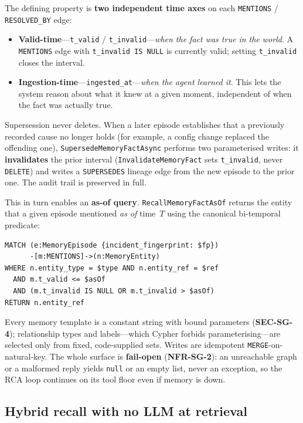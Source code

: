 \documentclass[11pt]{article}
\begin{document}
The defining property is \textbf{two independent time axes} on each
\texttt{MENTIONS} / \texttt{RESOLVED\_BY} edge:

\begin{itemize}
  \item \textbf{Valid-time}---\texttt{t\_valid} / \texttt{t\_invalid}---\emph{when
    the fact was true in the world}. A \texttt{MENTIONS} edge with
    \texttt{t\_invalid IS NULL} is currently valid; setting \texttt{t\_invalid}
    closes the interval.
  \item \textbf{Ingestion-time}---\texttt{ingested\_at}---\emph{when the agent
    learned it}. This lets the system reason about what it knew at a given moment,
    independent of when the fact was actually true.
\end{itemize}

Supersession never deletes. When a later episode establishes that a previously
recorded cause no longer holds (for example, a config change replaced the
offending one), \texttt{SupersedeMemoryFactAsync} performs two parameterised
writes: it \textbf{invalidates} the prior interval (\texttt{InvalidateMemoryFact}
sets \texttt{t\_invalid}, never \texttt{DELETE}) and writes a \texttt{SUPERSEDES}
lineage edge from the new episode to the prior one. The audit trail is preserved
in full.

This in turn enables an \textbf{as-of query}. \texttt{RecallMemoryFactAsOf}
returns the entity that a given episode mentioned \emph{as of} time~$T$ using the
canonical bi-temporal predicate:

\begin{verbatim}
MATCH (e:MemoryEpisode {incident_fingerprint: $fp})
      -[m:MENTIONS]->(n:MemoryEntity)
WHERE n.entity_type = $type AND n.entity_ref = $ref
  AND m.t_valid <= $asOf
  AND (m.t_invalid IS NULL OR m.t_invalid > $asOf)
RETURN n.entity_ref
\end{verbatim}

Every memory template is a constant string with bound parameters
(\textbf{SEC-SG-4}); relationship types and labels---which Cypher forbids
parameterising---are selected only from fixed, code-supplied sets. Writes are
idempotent \texttt{MERGE}-on-natural-key. The whole surface is \textbf{fail-open}
(\textbf{NFR-SG-2}): an unreachable graph or a malformed reply yields \texttt{null}
or an empty list, never an exception, so the RCA loop continues on its tool floor
even if memory is down.

\subsection{Hybrid recall with no LLM at retrieval}
\label{sec:recall}
\end{document}
